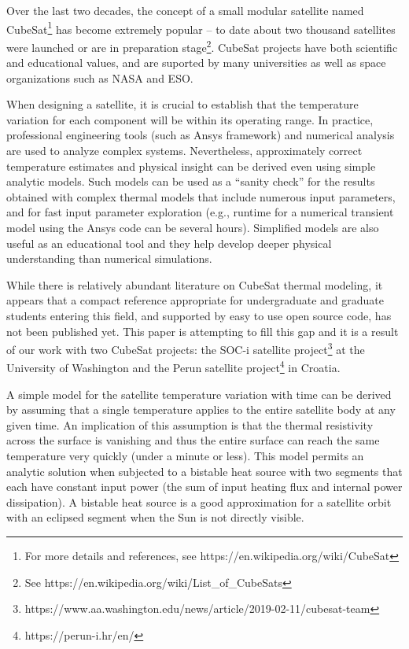 \documentclass[]{aastex62}
\begin{document}
Over the last two decades, the concept of a small modular satellite named CubeSat\footnote{For more 
details and references, see https://en.wikipedia.org/wiki/CubeSat} has become
extremely popular -- to date about two thousand satellites were launched or are in preparation 
stage\footnote{See https://en.wikipedia.org/wiki/List\_of\_CubeSats}. CubeSat projects have both
scientific and educational values, and are suported by many universities as well as space organizations
such as NASA and ESO. 

When designing a satellite, it is crucial to establish that the temperature variation for each component 
will be within its operating range. In practice, professional engineering tools (such as Ansys framework)
and numerical analysis are used to analyze complex systems. Nevertheless, approximately correct temperature estimates 
and physical insight can be derived even using simple analytic models. Such models can be used as
a ``sanity check'' for the results obtained with complex thermal models that include 
numerous input parameters, and for fast input parameter exploration (e.g., runtime for a numerical 
transient model using the Ansys code can be several hours). Simplified models are also useful as an
educational tool and they help develop deeper physical understanding than numerical simulations. 

While there is relatively abundant literature on CubeSat thermal modeling, it appears that a 
compact reference appropriate for undergraduate and graduate students entering this field,
and supported by easy to use open source code, has not been published yet. This paper is
attempting to fill this gap and it is a result of our work with two CubeSat projects:  the SOC-i satellite project\footnote{https://www.aa.washington.edu/news/article/2019-02-11/cubesat-team}
at the University of Washington and the Perun satellite project\footnote{https://perun-i.hr/en/} in Croatia.  

A simple model for the satellite temperature variation with time can be derived by assuming that a single
temperature applies to the entire satellite body at any  given time. An implication of this assumption is 
that the thermal resistivity across the surface is vanishing and thus the entire surface can reach the
same temperature very quickly (under a minute or less). This model permits an analytic solution 
when subjected to a bistable heat source with two segments that each have constant input power 
(the sum of input heating flux and internal power dissipation). A bistable heat source is a good 
approximation for a satellite orbit with an eclipsed segment when the Sun is not directly visible. 
\end{document}
